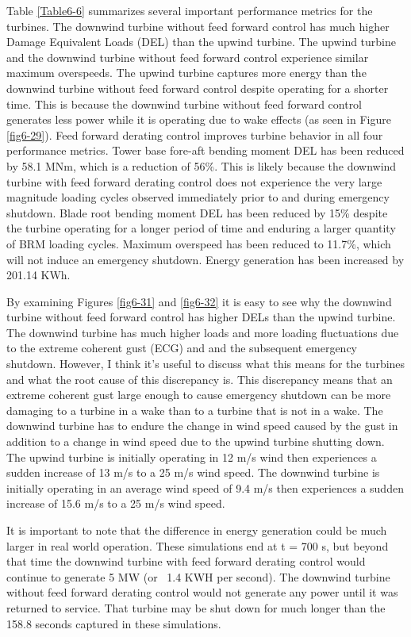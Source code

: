 Table \ref{Table6-6} summarizes several important performance metrics for the turbines. The downwind turbine without feed forward control has much higher Damage Equivalent Loads (DEL) than the upwind turbine. The upwind turbine and the downwind turbine without feed forward control experience similar maximum overspeeds. The upwind turbine captures more energy than the downwind turbine without feed forward control despite operating for a shorter time. This is because the downwind turbine without feed forward control generates less power while it is operating due to wake effects (as seen in Figure \ref{fig6-29}). Feed forward derating control improves turbine behavior in all four performance metrics. Tower base fore-aft bending moment DEL has been reduced by 58.1 MNm, which is a reduction of 56\%. This is likely because the downwind turbine with feed forward derating control does not experience the very large magnitude loading cycles observed immediately prior to and during emergency shutdown. Blade root bending moment DEL has been reduced by 15\% despite the turbine operating for a longer period of time and enduring a larger quantity of BRM loading cycles. Maximum overspeed has been reduced to 11.7\%, which will not induce an emergency shutdown. Energy generation has been increased by 201.14 KWh.


By examining Figures \ref{fig6-31} and \ref{fig6-32} it is easy to see why the downwind turbine without feed forward control has higher DELs than the upwind turbine. The downwind turbine has much higher loads and more loading fluctuations due to the extreme coherent gust (ECG) and and the subsequent emergency shutdown. However, I think it's useful to discuss what this means for the turbines and what the root cause of this discrepancy is. This discrepancy means that an extreme coherent gust large enough to cause emergency shutdown can be more damaging to a turbine in a wake than to a turbine that is not in a wake. The downwind turbine has to endure the change in wind speed caused by the gust in addition to a change in wind speed due to the upwind turbine shutting down. The upwind turbine is initially operating in 12 m/s wind then experiences a sudden increase of 13 m/s to a 25 m/s wind speed. The downwind turbine is initially operating in an average wind speed of 9.4 m/s then experiences a sudden increase of 15.6 m/s to a 25 m/s wind speed.

It is important to note that the difference in energy generation could be much larger in real world operation. These simulations end at t = 700 s, but beyond that time the downwind turbine with feed forward derating control would continue to generate 5 MW (or ~1.4 KWH per second). The downwind turbine without feed forward derating control would not generate any power until it was returned to service. That turbine may be shut down for much longer than the 158.8 seconds captured in these simulations.


